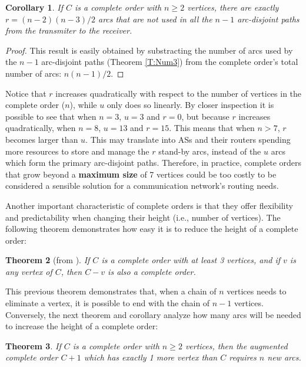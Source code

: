\documentclass[5p,twocolumn]{elsarticle}
\newtheorem{theorem}{Theorem}
\newtheorem{corollary}[theorem]{Corollary}
\begin{document}
\begin{corollary}\label{T:Num4}
If $C$ is a complete order with $n\geq2$ vertices, there are exactly $r={(n-2)(n-3)}/2$ arcs that are not used in all the $n-1$ arc-disjoint paths from the transmiter to the receiver.
\end{corollary}

\begin{proof}
This result is easily obtained by substracting the number of arcs used by the $n-1$ arc-disjoint paths (Theorem \ref{T:Num3}) from the complete order's total number of arcs: $n(n-1)/2$.
\end{proof}

Notice that $r$ increases quadratically with respect to the number of vertices in the complete order ($n$), while $u$ only does so linearly. By closer inspection it is possible to see that when $n=3$, $u=3$ and $r=0$, but because $r$ increases quadratically, when $n=8$, $u=13$ and $r=15$. This means that when $n>7$, $r$ becomes larger than $u$. This may translate into ASs and their routers spending more resources to store and manage the $r$ stand-by arcs, instead of the $u$ arcs which form the primary arc-disjoint paths. Therefore, in practice, complete orders that grow beyond a \textbf{maximum size} of 7 vertices could be too costly to be considered a sensible solution for a communication network's routing needs.

Another important characteristic of complete orders is that they offer flexibility and predictability when changing their height (i.e., number of vertices). The following theorem demonstrates how easy it is to reduce the height of a complete order:

\begin{theorem}[from \cite{Harary1965}]\label{T:Num5}
If $C$ is a complete order with at least 3 vertices, and if $v$ is any vertex of $C$, then $C-v$ is also a complete order.
\end{theorem}

This previous theorem demonstrates that, when a chain of $n$ vertices needs to eliminate a vertex, it is possible to end with the chain of $n-1$ vertices. Conversely, the next theorem and corollary analyze how many arcs will be needed to increase the height of a complete order:

\begin{theorem}\label{T:Num6}
If $C$ is a complete order with $n\geq2$ vertices, then the augmented complete order $C+1$ which has exactly 1 more vertex than $C$ requires $n$ new arcs.
\end{theorem}
\end{document}
